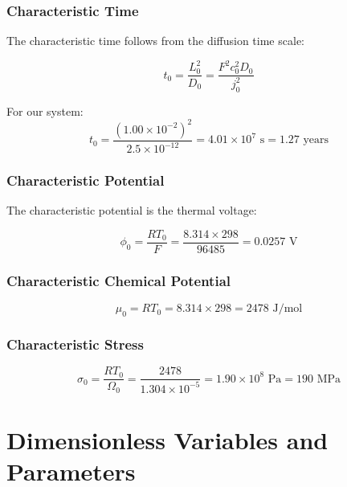 \documentclass[11pt,a4paper]{article}
\begin{document}
\subsubsection{Characteristic Time}

The characteristic time follows from the diffusion time scale:

\begin{equation}
t_0 = \frac{L_0^2}{D_0} = \frac{F^2 c_0^2 D_0}{j_0^2}
\label{eq:t0}
\end{equation}

For our system:
\begin{equation}
t_0 = \frac{(1.00 \times 10^{-2})^2}{2.5 \times 10^{-12}} = 4.01 \times 10^{7} \text{ s} = 1.27 \text{ years}
\end{equation}

\subsubsection{Characteristic Potential}

The characteristic potential is the thermal voltage:

\begin{equation}
\phi_0 = \frac{RT_0}{F} = \frac{8.314 \times 298}{96485} = 0.0257 \text{ V}
\label{eq:phi0}
\end{equation}

\subsubsection{Characteristic Chemical Potential}

\begin{equation}
\mu_0 = RT_0 = 8.314 \times 298 = 2478 \text{ J/mol}
\label{eq:mu0}
\end{equation}

\subsubsection{Characteristic Stress}

\begin{equation}
\sigma_0 = \frac{RT_0}{\Omega_0} = \frac{2478}{1.304 \times 10^{-5}} = 1.90 \times 10^8 \text{ Pa} = 190 \text{ MPa}
\label{eq:sigma0}
\end{equation}

\section{Dimensionless Variables and Parameters}
\end{document}
